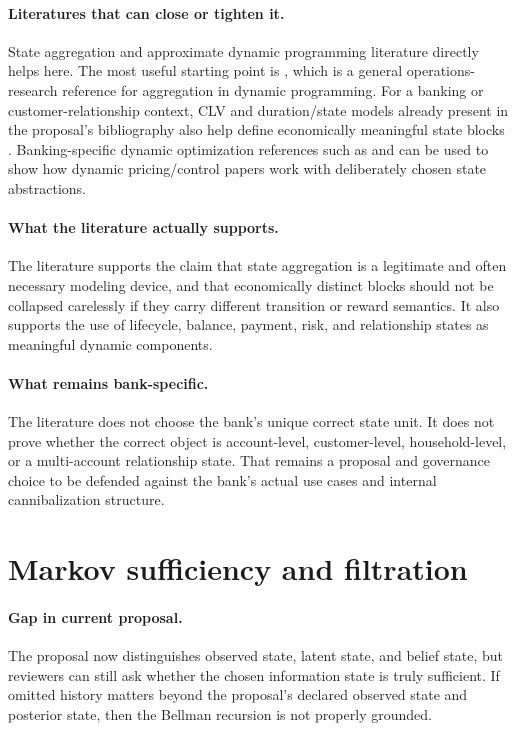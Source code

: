 \documentclass[11pt]{article}
\begin{document}
\paragraph{Literatures that can close or tighten it.}
State aggregation and approximate dynamic programming literature directly helps
here. The most useful starting point is \citet{bean1987aggregation}, which is a
general operations-research reference for aggregation in dynamic programming.
For a banking or customer-relationship context, CLV and duration/state models
already present in the proposal's bibliography also help define economically
meaningful state blocks \citep{schmittlein1987counting,fader2005bgnbd,
bolton1998duration}. Banking-specific dynamic optimization references such as
\citet{thomas2011creditcardmdp} and \citet{lewis2005relationshippricing} can be
used to show how dynamic pricing/control papers work with deliberately chosen
state abstractions.

\paragraph{What the literature actually supports.}
The literature supports the claim that state aggregation is a legitimate and
often necessary modeling device, and that economically distinct blocks should
not be collapsed carelessly if they carry different transition or reward
semantics. It also supports the use of lifecycle, balance, payment, risk, and
relationship states as meaningful dynamic components.

\paragraph{What remains bank-specific.}
The literature does not choose the bank's unique correct state unit. It does not
prove whether the correct object is account-level, customer-level,
household-level, or a multi-account relationship state. That remains a proposal
and governance choice to be defended against the bank's actual use cases and
internal cannibalization structure.

\section{Markov sufficiency and filtration}

\paragraph{Gap in current proposal.}
The proposal now distinguishes observed state, latent state, and belief state,
but reviewers can still ask whether the chosen information state is truly
sufficient. If omitted history matters beyond the proposal's declared observed
state and posterior state, then the Bellman recursion is not properly grounded.
\end{document}
